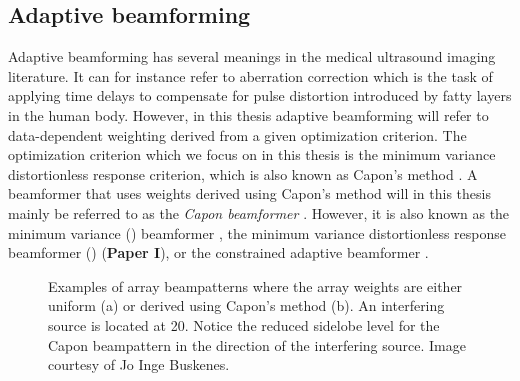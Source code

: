\subsection{Adaptive beamforming}\label{sec:adaptbf}
Adaptive beamforming has several meanings in the medical ultrasound imaging literature. It can for instance refer to aberration correction \cite{cole1996method} which is the task of applying time delays to compensate for pulse distortion introduced by fatty layers in the human body. However, in this thesis adaptive beamforming will refer to data-dependent weighting derived from a given optimization criterion. The optimization criterion which we focus on in this thesis is the minimum variance distortionless response criterion, which is also known as Capon's method \cite{Capon1969}. A beamformer that uses weights derived using Capon's method will in this thesis mainly be referred to as the \textit{Capon beamformer} \cite{Vignon2008}. However, it is also known as the minimum variance  () beamformer \cite{Synnevag2007}, the minimum variance distortionless response beamformer () (\textbf{Paper I}), or the constrained adaptive beamformer \cite{Mann2002}.

\begin{figure}[t!]
\caption{Examples of array beampatterns where the array weights are either uniform (a) or derived using Capon's method (b). An interfering source is located at 20\degree. Notice the reduced sidelobe level for the Capon beampattern in the direction of the interfering source. Image courtesy of Jo Inge Buskenes.}
\label{fig:weights}
\end{figure}

